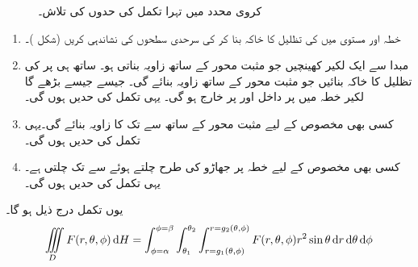 \begin{figure}
\begin{subfigure}{0.52\textwidth}
\end{subfigure}
\caption{کروی محدد میں تہرا تکمل کی حدوں کی تلاش۔}
\label{شکل_کثیر_کروی_تکمل_کے_حدوں_تلاش}
\end{figure}


\begin{enumerate}[1.]
\item
{}\quad
خطہ  اور مستوی  میں  کی تظلیل   کا خاکہ بنا کر  کی سرحدی سطحوں کی نشاندہی کریں (شکل )۔
\item
{}\quad
مبدا سے ایک لکیر  کھینچیں جو مثبت محور  کے ساتھ زاویہ  بناتی ہو۔ ساتھ ہی  پر  کی تظلیل  کا خاکہ بنائیں جو مثبت محور  کے ساتھ زاویہ  بنائے گی۔ جیسے جیسے  بڑھے گا  لکیر  خطہ  میں  پر  داخل اور  پر  خارج ہو گی۔ یہی تکمل کی  حدیں ہوں گی۔
\item
{}\quad
کسی بھی مخصوص  کے لیے   مثبت محور  کے ساتھ  سے  تک کا  زاویہ بنائے گی۔یہی تکمل کی  حدیں ہوں گی۔
\item
{}\quad
کسی بھی مخصوص  کے لیے    خطہ  پر جھاڑو کی طرح چلتے ہوئے  سے  تک چلتی ہے۔  یہی تکمل کی  حدیں ہوں گی۔
\end{enumerate}
یوں تکمل درج ذیل ہو گا۔
\begin{align*}
\iiint\limits_D F(r,\theta,\phi)\dif H=\int_{\phi=\alpha}^{\phi=\beta}\int_{\theta_1}^{\theta_2}\int_{r=g_1(\theta,\phi)}^{r=g_2(\theta,\phi)} F(r,\theta,\phi) r^2\sin\theta \dif r\dif \theta \dif \phi
\end{align*} 


